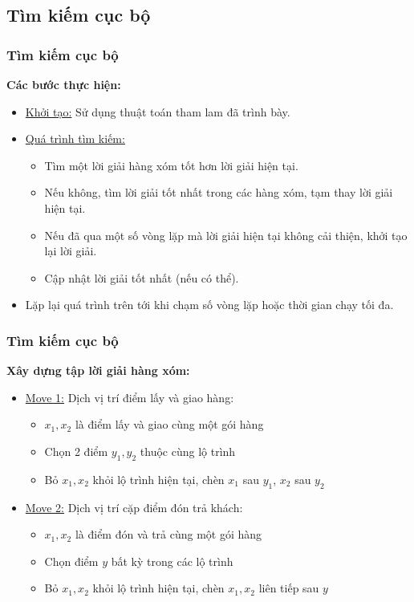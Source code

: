 \documentclass{beamer}
\begin{document}
	\subsection{Tìm kiếm cục bộ}
	\begin{frame}
		\frametitle{Tìm kiếm cục bộ}
		\textbf{Các bước thực hiện:}
		\begin{itemize}
			\item \underline{Khởi tạo:} Sử dụng thuật toán tham lam đã trình bày.
			\item {
				\underline{Quá trình tìm kiếm:}
				\begin{itemize}
					\item Tìm một lời giải hàng xóm tốt hơn lời giải hiện tại.
					\item Nếu không, tìm lời giải tốt nhất trong các hàng xóm, tạm thay lời giải hiện tại.
					\item Nếu đã qua một số vòng lặp mà lời giải hiện tại không cải thiện, khởi tạo lại lời giải.
					\item Cập nhật lời giải tốt nhất (nếu có thể).
				\end{itemize}
			}
			\item Lặp lại quá trình trên tới khi chạm số vòng lặp hoặc thời gian chạy tối đa.
		\end{itemize}
	\end{frame}

	\begin{frame}
		\frametitle{Tìm kiếm cục bộ}
		\textbf{Xây dựng tập lời giải hàng xóm:}
		\begin{itemize}
			\item {\underline{Move 1:} Dịch vị trí điểm lấy và giao hàng:
				\begin{itemize}
					\item $x_1,x_2$ là điểm lấy và giao cùng một gói hàng
					\item Chọn 2 điểm $y_1, y_2$ thuộc cùng lộ trình
					\item Bỏ $x_1, x_2$ khỏi lộ trình hiện tại, chèn $x_1$ sau $y_1$, $x_2$ sau $y_2$
				\end{itemize}
			}
			\item {\underline{Move 2:} Dịch vị trí cặp điểm đón trả khách:
				\begin{itemize}
					\item $x_1,x_2$ là điểm đón và trả cùng một gói hàng
					\item Chọn điểm $y$ bất kỳ trong các lộ trình
					\item Bỏ $x_1, x_2$ khỏi lộ trình hiện tại, chèn $x_1,x_2$ liên tiếp sau $y$
				\end{itemize}
			}
		\end{itemize}
		
	\end{frame}
\end{document}
